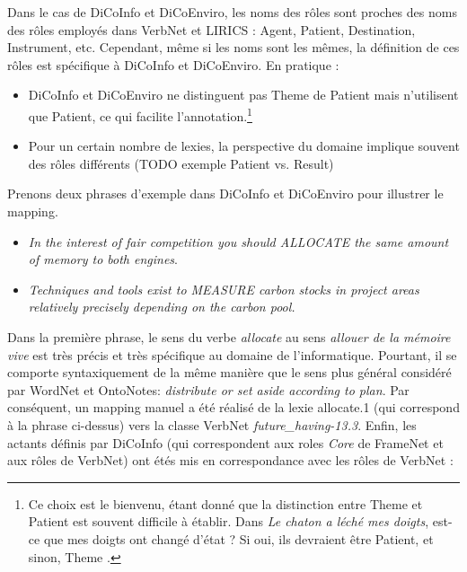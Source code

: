 Dans le cas de DiCoInfo et DiCoEnviro, les noms des rôles sont proches des noms
des rôles employés dans VerbNet et LIRICS \citep{bonial2011hierarchical} :
Agent, Patient, Destination, Instrument, etc. Cependant, même si les noms sont
les mêmes, la définition de ces rôles est spécifique à DiCoInfo et DiCoEnviro.
En pratique :

\begin{itemize}

    \item DiCoInfo et DiCoEnviro ne distinguent pas Theme de Patient mais
n'utilisent que Patient, ce qui facilite l'annotation.\footnote{Ce choix est le
bienvenu, étant donné que la distinction entre Theme et Patient est souvent
difficile à établir. Dans \textit{Le chaton a léché mes doigts}, est-ce que mes
doigts ont changé d'état ? Si oui, ils devraient être Patient, et sinon, Theme
\citep[p.~5]{palmer2010semantic}.}

    \item Pour un certain nombre de lexies, la perspective du domaine implique
souvent des rôles différents (TODO exemple Patient vs. Result)

\end{itemize}

Prenons deux phrases d'exemple dans DiCoInfo et DiCoEnviro pour illustrer le
mapping.

\begin{itemize}
    \item \textit{In the interest of fair competition you should ALLOCATE the
        same amount of memory to both engines}.
    \item \textit{Techniques and tools exist to MEASURE carbon stocks in project areas
        relatively precisely depending on the carbon pool.}
\end{itemize}

Dans la première phrase, le sens du verbe \textit{allocate} au sens
\textit{allouer de la mémoire vive} est très précis et très spécifique au domaine
de l'informatique. Pourtant, il se comporte syntaxiquement de la même manière
que le sens plus général considéré par WordNet et OntoNotes: \textit{distribute
or set aside according to plan}. Par conséquent, un mapping manuel a été
réalisé de la lexie allocate.1 (qui correspond à la phrase ci-dessus) vers la
classe VerbNet \textit{future\_having-13.3}. Enfin, les actants définis par
DiCoInfo (qui correspondent aux roles \textit{Core} de FrameNet et aux rôles de
VerbNet) ont étés mis en correspondance avec les rôles de VerbNet :

